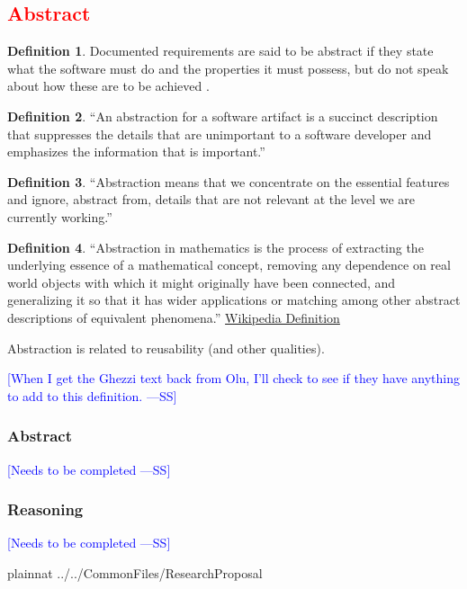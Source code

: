 \documentclass[letterpaper, cleveref]{lipics-v2019}
\newcommand{\authornote}[3]{\textcolor{#1}{[#3 ---#2]}}
\newcommand{\authornote}[3]{}
\newcommand{\wss}[1]{\authornote{blue}{SS}{#1}} %
\newcommand{\notdone}[1]{\textcolor{red}{#1}}
\theoremstyle{definition}
\newtheorem{defn}{Definition}
\begin{document}

\subsection{\notdone{Abstract}} %

\begin{defn}
  Documented requirements are said to be abstract if they state what the
  software must do and the properties it must possess, but do not speak about
  how these are to be achieved \citep{GhezziEtAl2003}.
\end{defn}

\begin{defn}
  ``An abstraction for a software artifact is a succinct description that
  suppresses the details that are unimportant to a software developer and
  emphasizes the information that is important.'' \citep{Krueger1992}
\end{defn}

\begin{defn}
  ``Abstraction means that we concentrate on the essential features and ignore,
  abstract from, details that are not relevant at the level we are currently
  working.''  \citep[p.\ 296]{VanVliet2000}
\end{defn}

\begin{defn}
  ``Abstraction in mathematics is the process of extracting the underlying
  essence of a mathematical concept, removing any dependence on real world
  objects with which it might originally have been connected, and generalizing
  it so that it has wider applications or matching among other abstract
  descriptions of equivalent phenomena.''
  \href{https://en.wikipedia.org/wiki/Abstraction_(mathematics)} {Wikipedia
    Definition}
\end{defn}

Abstraction is related to reusability (and other qualities).

\wss{When I get the Ghezzi text back from Olu, I'll check to see if they have
  anything to add to this definition.}

\begin{mybox}
\subsubsection*{Abstract} 
\wss{Needs to be completed}
\end{mybox}

\subsubsection*{Reasoning}

\wss{Needs to be completed}


\newpage

 {plainnat}
 {../../CommonFiles/ResearchProposal}
\end{document}
